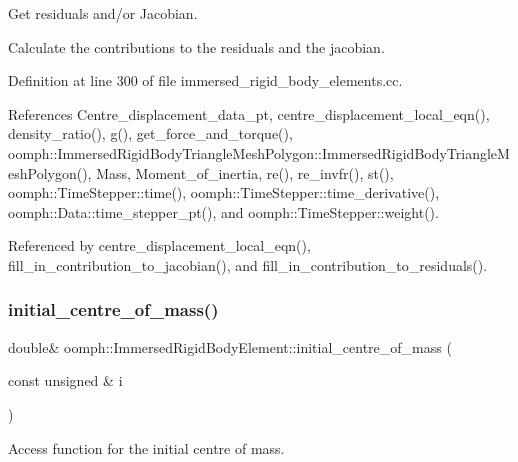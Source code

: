 Get residuals and/or Jacobian. 

Calculate the contributions to the residuals and the jacobian. 

Definition at line 300 of file immersed\+\_\+rigid\+\_\+body\+\_\+elements.\+cc.



References Centre\+\_\+displacement\+\_\+data\+\_\+pt, centre\+\_\+displacement\+\_\+local\+\_\+eqn(), density\+\_\+ratio(), g(), get\+\_\+force\+\_\+and\+\_\+torque(), oomph\+::\+Immersed\+Rigid\+Body\+Triangle\+Mesh\+Polygon\+::\+Immersed\+Rigid\+Body\+Triangle\+Mesh\+Polygon(), Mass, Moment\+\_\+of\+\_\+inertia, re(), re\+\_\+invfr(), st(), oomph\+::\+Time\+Stepper\+::time(), oomph\+::\+Time\+Stepper\+::time\+\_\+derivative(), oomph\+::\+Data\+::time\+\_\+stepper\+\_\+pt(), and oomph\+::\+Time\+Stepper\+::weight().



Referenced by centre\+\_\+displacement\+\_\+local\+\_\+eqn(), fill\+\_\+in\+\_\+contribution\+\_\+to\+\_\+jacobian(), and fill\+\_\+in\+\_\+contribution\+\_\+to\+\_\+residuals().

\mbox{\label{classoomph_1_1ImmersedRigidBodyElement_a3c436ba641c221d647dd21a67a583c49}} 
\subsubsection{\texorpdfstring{initial\+\_\+centre\+\_\+of\+\_\+mass()}{initial\_centre\_of\_mass()}\hspace{0.1cm}{\footnotesize\ttfamily [1/2]}}
{\footnotesize\ttfamily double\& oomph\+::\+Immersed\+Rigid\+Body\+Element\+::initial\+\_\+centre\+\_\+of\+\_\+mass (\begin{DoxyParamCaption}\item[{const unsigned \&}]{i }\end{DoxyParamCaption})\hspace{0.3cm}{\ttfamily [inline]}}



Access function for the initial centre of mass. 



